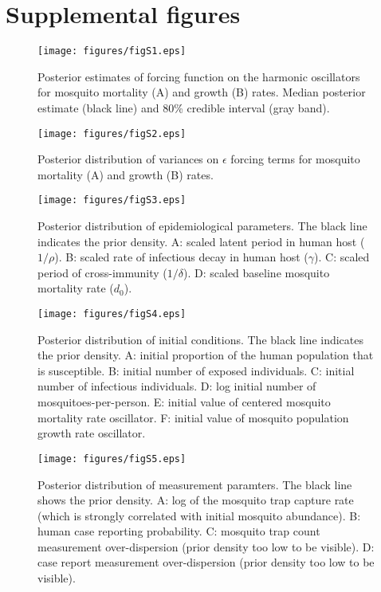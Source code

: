 \documentclass[12pt,letterpaper]{article}
\begin{document}



\newpage

\section*{Supplemental figures}

\begin{figure}[!h]
\texttt{[image: figures/figS1.eps]}
\caption{
Posterior estimates of forcing function on the harmonic oscillators for mosquito mortality (A) and growth (B) rates.  Median posterior estimate (black line) and 80\% credible interval (gray band).
}
\end{figure}

\begin{figure}[!h]
\texttt{[image: figures/figS2.eps]}
\caption{
Posterior distribution of variances on $\epsilon$ forcing terms for mosquito mortality (A) and growth (B) rates.
}
\end{figure}

\begin{figure}[!h]
\texttt{[image: figures/figS3.eps]}
\caption{
Posterior distribution of epidemiological parameters.  The black line indicates the prior density. A: scaled latent period in human host ($1/\rho$). B: scaled rate of infectious decay in human host ($\gamma$). C: scaled period of cross-immunity ($1/\delta$). D: scaled baseline mosquito mortality rate ($d_0$).
}
\end{figure}

\begin{figure}[!h]
\texttt{[image: figures/figS4.eps]}
\caption{Posterior distribution of initial conditions. The black line indicates the prior density. A: initial proportion of the human population that is susceptible. B: initial number of exposed individuals. C: initial number of infectious individuals. D: log initial number of mosquitoes-per-person. E: initial value of centered mosquito mortality rate oscillator. F: initial value of mosquito population growth rate oscillator.
}
\end{figure}

\begin{figure}[!h]
\texttt{[image: figures/figS5.eps]}
\caption{Posterior distribution of measurement paramters. The black line shows the prior density. A: log of the mosquito trap capture rate (which is strongly correlated with initial mosquito abundance). B: human case reporting probability. C: mosquito trap count measurement over-dispersion (prior density too low to be visible). D: case report measurement over-dispersion (prior density too low to be visible).}
\end{figure}
\end{document}
